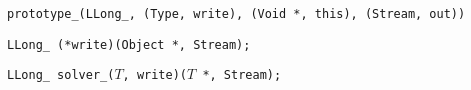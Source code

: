 
\tt{prototype_(LLong_, (Type, write), (Void *, this), (Stream, out))}


\tt{LLong_ (*write)(Object *, Stream);}


\tt{LLong_ solver_(}$T$\tt{, write)(}$T$ \tt{*, Stream);}

